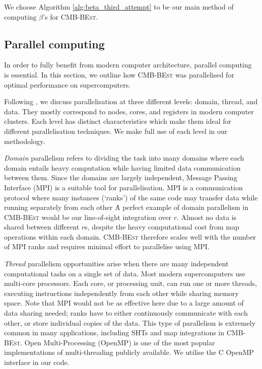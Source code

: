 We choose Algorithm \ref{alg:beta_third_attempt} to be our main method of computing $\beta$'s for \textsc{CMB-BEst}.

\subsection{Parallel computing}


In order to fully benefit from modern computer architecture, parallel computing is essential. In this section, we outline how \textsc{CMB-BEst} was parallelised for optimal performance on supercomputers.

Following \cite{Jeffers2016intel}, we discuss parallelisation at three different levels: domain, thread, and data. They mostly correspond to nodes, cores, and registers in modern computer clusters. Each level has distinct characteristics which make them ideal for different parallelisation techniques. We make full use of each level in our methodology.

\textit{Domain} parallelism refers to dividing the task into many domains where each domain entails heavy computation while having limited data communication between them. Since the domains are largely independent, Message Passing Interface (MPI) \cite{Gropp1999MPI} is a suitable tool for parallelisation. MPI is a communication protocol where many instances (`ranks') of the same code may transfer data while running separately from each other \. A perfect example of domain parallelism in \textsc{CMB-BEst} would be our line-of-sight integration over $r$. Almost no data is shared between different $r$s, despite the heavy computational cost from map operations within each domain. \textsc{CMB-BEst} therefore scales well with the number of MPI ranks and requires minimal effort to parallelise using MPI.

\textit{Thread} parallelism opportunities arise when there are many independent computational tasks on a single set of data. Most modern supercomputers use multi-core processors. Each core, or processing unit, can run one or more threads, executing instructions independently from each other while sharing memory space. Note that MPI would not be as effective here due to a large amount of data sharing needed; ranks have to either continuously communicate with each other, or store individual copies of the data. This type of parallelism is extremely common in many applications, including SHTs and map integrations in \textsc{CMB-BEst}. Open Multi-Processing (OpenMP) \cite{Dagum1998openmp} is one of the most popular implementations of multi-threading publicly available. We utilise the \textsc{C} OpenMP interface in our code. 

